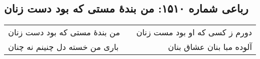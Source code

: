 \begin{center}
\section*{رباعی شماره ۱۵۱۰: من بندهٔ مستی که بود دست زنان}
\label{sec:1510}
\begin{longtable}{l p{0.5cm} r}
من بندهٔ مستی که بود دست زنان
&&
دورم ز کسی که او بود مست زنان
\\
باری من خسته دل چنینم نه چنان
&&
آلوده مبا بنان عشاق بنان
\\
\end{longtable}
\end{center}
